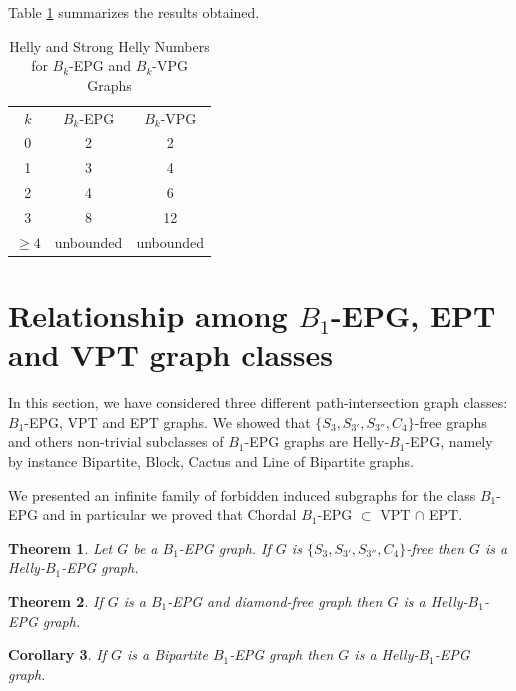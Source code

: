 \documentclass[12pt]{article}
\newtheorem{theorem}{Theorem}
\newtheorem{cor}[theorem]{Corollary}
\begin{document}
Table \ref{tab:Helly-Strong-Helly} summarizes the results obtained.

\begin{table}[htb]
    \centering
    \begin{tabular}{c|c|c}
    \cline{1-3} $k$  & $B_k$-EPG & $B_k$-VPG \\
    \cline{1-3} 0 & 2 & 2 \\
    \cline{1-3} 1 & 3 & 4 \\
    \cline{1-3} 2 & 4 & 6 \\
    \cline{1-3} 3 & 8 & 12 \\
    \cline{1-3} $\geq 4$ & unbounded & unbounded \\
    \cline{1-3} 
    \end{tabular}
    \caption{Helly and Strong Helly Numbers for $B_k$-EPG and $B_k$-VPG Graphs}
    \label{tab:Helly-Strong-Helly}
\end{table}

\section{Relationship among  $B_1$-EPG, EPT and VPT graph classes}

In this section, we have considered three different path-intersection graph classes: $B_1$-EPG, VPT and EPT graphs. We showed that  $\{S_3, S_{3'},S_{3''},C_4\}$-free graphs and others non-trivial subclasses of  $B_1$-EPG graphs are Helly-$B_1$-EPG, namely by instance Bipartite, Block, Cactus and Line of Bipartite graphs. 
  
 We presented an infinite family of forbidden induced subgraphs for the class  $B_1$-EPG and in particular we proved  that Chordal $B_1$-EPG $\subset$ VPT $\cap$ EPT.  
 
 \begin{theorem}
\label{lem:chordalDiamondFree}
Let $G$ be a $B_1$-EPG graph. If $G$ is  $\{S_{3}, S_{3'}, S_{3''}, C_{4}\}$-free then $G$  is a Helly-$B_1$-EPG graph.
\end{theorem}

\begin{theorem} \label{lem:b1DiamondFree}
 If $G$ is a $B_1$-EPG and diamond-free graph then $G$ is a Helly-$B_1$-EPG graph.
 \end{theorem}
 
 \begin{cor}
If $G$ is a Bipartite $B_1$-EPG graph then $G$ is a Helly-$B_1$-EPG graph.
\end{cor}
\end{document}

